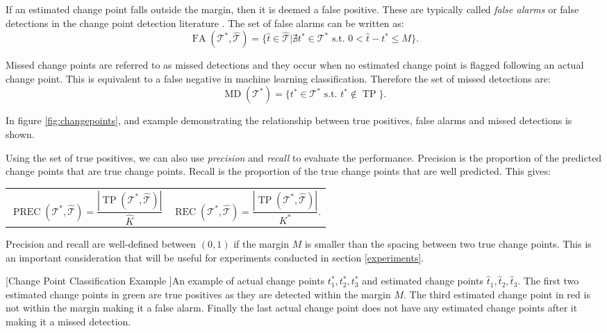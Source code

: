If an estimated change point falls outside the margin, then it is deemed a false positive. These are typically called \textit{false alarms} or false detections in the change point detection literature \cite{lee2010change}. The set of false alarms can be written as:
\begin{equation}
\operatorname{FA}(\mathcal{T}^*, \hat{\mathcal{T}}) = \{\hat{t} \in  \hat{\mathcal{T}} | \nexists t^* \in \mathcal{T}^* \text{ s.t. } 0 < \hat{t} - t^* \leq M\}.
\end{equation}

Missed change points are referred to as missed detections and they occur when no estimated change point is flagged following an actual change point. This is equivalent to a false negative in machine learning classification. Therefore the set of missed detections are:
\begin{equation}
\operatorname{MD}(\mathcal{T}^*) = \{t^* \in \mathcal{T}^*  \text{ s.t. } t^* \notin \operatorname{TP} \}.
\end{equation}

In figure \ref{fig:changepoints}, and example demonstrating the relationship between true positives, false alarms and missed detections is shown.

Using the set of true positives, we can also use \textit{precision} and \textit{recall} to evaluate the performance. Precision is the proportion of the predicted change points that are true change points. Recall is the proportion of the true change points that are well predicted. This gives:

\noindent
\begin{tabularx}{\linewidth}{@{}XX@{}}
\begin{equation}
\operatorname{PREC}(\mathcal{T}^{*}, \hat{\mathcal{T}})=\frac{|\operatorname{TP}(\mathcal{T}^{*}, \hat{\mathcal{T}})|} {\hat{K}}
\end{equation}
&
\begin{equation}
\operatorname{REC}(\mathcal{T}^{*}, \hat{\mathcal{T}})=\frac{|\operatorname{TP}(\mathcal{T}^{*}, \hat{\mathcal{T}})|} {K^*}.
\end{equation}
\end{tabularx}
Precision and recall are well-defined between $(0,1)$ if the margin $M$ is smaller than the spacing between two true change points. This is an important consideration that will be useful for experiments conducted in section \ref{experiments}.

\begin{center} 
[Change Point Classification Example ]{An example of actual change points $t_1^*, t_2^*, t_3^*$ and estimated change points ${\hat{t}_1, \hat{t}_2, \hat{t}_3}$. The first two estimated change points in green are true positives as they are detected within the margin $M$.  The third estimated change point in red is not within the margin making it a false alarm. Finally the last actual change point does not have any estimated change points after it making it a missed detection.} 
\label{fig:changepoints} 
\end{center}

